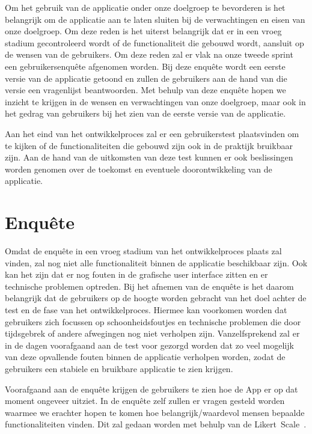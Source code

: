 Om het gebruik van de applicatie onder onze doelgroep te bevorderen is het belangrijk om de applicatie aan te laten sluiten bij de verwachtingen en eisen van onze doelgroep. Om deze reden is het uiterst belangrijk dat er in een vroeg stadium gecontroleerd wordt of de functionaliteit die gebouwd wordt, aansluit op de wensen van de gebruikers. Om deze reden zal er vlak na onze tweede sprint een gebruikersenquête afgenomen worden. Bij deze enquête wordt een eerste versie van de applicatie getoond en zullen de gebruikers aan de hand van die versie een vragenlijst beantwoorden. Met behulp van deze enquête hopen we inzicht te krijgen in de wensen en verwachtingen van onze doelgroep, maar ook in het gedrag van gebruikers bij het zien van de eerste versie van de applicatie.

Aan het eind van het ontwikkelproces zal er een gebruikerstest plaatsvinden om te kijken of de functionaliteiten die gebouwd zijn ook in de praktijk bruikbaar zijn. Aan de hand van de uitkomsten van deze test kunnen er ook beslissingen worden genomen over de toekomst en eventuele doorontwikkeling van de applicatie.

\section{Enquête}
Omdat de enquête in een vroeg stadium van het ontwikkelproces plaats zal vinden, zal nog niet alle functionaliteit binnen de applicatie beschikbaar zijn. Ook kan het zijn dat er nog fouten in de grafische user interface zitten en er technische problemen optreden. Bij het afnemen van de enquête is het daarom belangrijk dat de gebruikers op de hoogte worden gebracht van het doel achter de test en de fase van het ontwikkelproces. Hiermee kan voorkomen worden dat gebruikers zich focussen op schoonheidsfoutjes en technische problemen die door tijdsgebrek of andere afwegingen nog niet verholpen zijn. Vanzelfsprekend zal er in de dagen voorafgaand aan de test voor gezorgd worden dat zo veel mogelijk van deze opvallende fouten binnen de applicatie verholpen worden, zodat de gebruikers een stabiele en bruikbare applicatie te zien krijgen.

Voorafgaand aan de enquête krijgen de gebruikers te zien hoe de App er op dat moment ongeveer uitziet. In de enquête zelf zullen er vragen gesteld worden waarmee we erachter hopen te komen hoe belangrijk/waardevol mensen bepaalde functionaliteiten vinden. Dit zal gedaan worden met behulp van de Likert~Scale~\cite{likert1932technique}.

